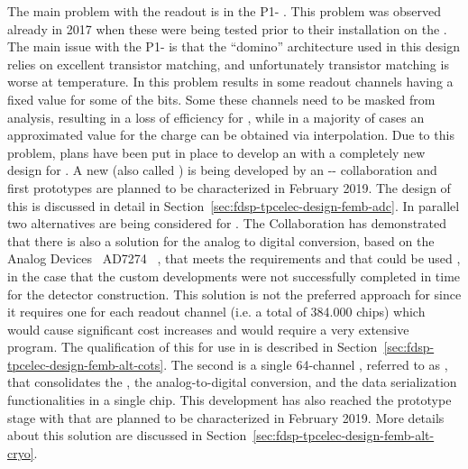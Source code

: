 The main problem with the   readout is in the
P1- . This problem was observed already in 2017
when these  were being tested prior to their installation
on the . The main issue with the P1- is 
that the ``domino'' architecture used in this design relies on
excellent transistor matching, and unfortunately transistor matching
is worse at  temperature. In  this problem
results in some readout channels having a fixed value for some of
the  bits. Some these channels need to be masked 
from analysis, resulting in a loss of efficiency for , while
in a majority of cases an approximated value for the charge can
be obtained via interpolation. Due to this problem, plans have
been put in place to develop an  with a completely new
design for . A new   (also called 
 ) is being developed by an 
-- collaboration and first
prototypes are planned to be characterized in February 2019. The design
of this  is discussed in detail in 
Section~\ref{sec:fdsp-tpcelec-design-femb-adc}. In parallel two
alternatives are being considered for . The  
Collaboration has demonstrated that there is also a  
solution for the analog to digital conversion, based on the Analog 
Devices~\cite{AnalogDevices} AD7274~\cite{AD7274} , that meets 
the  requirements and that could be used , in the
case that the custom  developments were not successfully
completed in time for the detector construction. This 
solution is not the preferred approach for  since it
requires one  for each readout channel (i.e. a total
of \num{384,000} chips) which would cause significant cost increases
and would require a very extensive  program. The qualification
of this   for use in  is described
in Section~\ref{sec:fdsp-tpcelec-design-femb-alt-cots}.
The second is a single \num{64}-channel , referred to as ,
that consolidates the , the analog-to-digital conversion, and the
data serialization functionalities in a single chip. This 
development has also reached the prototype stage with 
that are planned to be characterized in February 2019. More details about this
solution are discussed in Section~\ref{sec:fdsp-tpcelec-design-femb-alt-cryo}.


